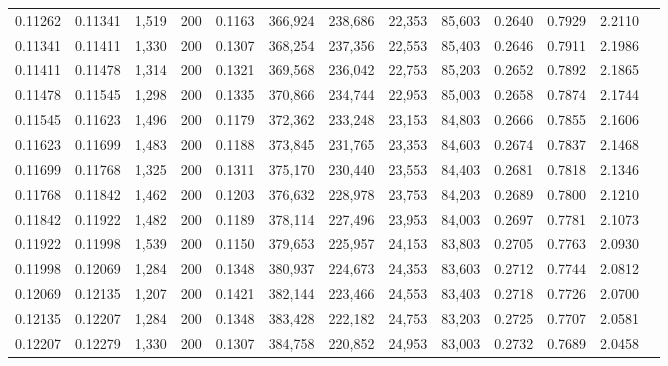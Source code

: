 \begin{tabular}{rrrrrrrrrrrrr}
0.11262 & 0.11341 &  1,519 & 200 &                                     0.1163 & 366,924 & 238,686 &  22,353 &  85,603 & 0.2640 & 0.7929 & 2.2110 \\
0.11341 & 0.11411 &  1,330 & 200 &                                     0.1307 & 368,254 & 237,356 &  22,553 &  85,403 & 0.2646 & 0.7911 & 2.1986 \\
0.11411 & 0.11478 &  1,314 & 200 &                                     0.1321 & 369,568 & 236,042 &  22,753 &  85,203 & 0.2652 & 0.7892 & 2.1865 \\
0.11478 & 0.11545 &  1,298 & 200 &                                     0.1335 & 370,866 & 234,744 &  22,953 &  85,003 & 0.2658 & 0.7874 & 2.1744 \\
0.11545 & 0.11623 &  1,496 & 200 &                                     0.1179 & 372,362 & 233,248 &  23,153 &  84,803 & 0.2666 & 0.7855 & 2.1606 \\
0.11623 & 0.11699 &  1,483 & 200 &                                     0.1188 & 373,845 & 231,765 &  23,353 &  84,603 & 0.2674 & 0.7837 & 2.1468 \\
0.11699 & 0.11768 &  1,325 & 200 &                                     0.1311 & 375,170 & 230,440 &  23,553 &  84,403 & 0.2681 & 0.7818 & 2.1346 \\
0.11768 & 0.11842 &  1,462 & 200 &                                     0.1203 & 376,632 & 228,978 &  23,753 &  84,203 & 0.2689 & 0.7800 & 2.1210 \\
0.11842 & 0.11922 &  1,482 & 200 &                                     0.1189 & 378,114 & 227,496 &  23,953 &  84,003 & 0.2697 & 0.7781 & 2.1073 \\
0.11922 & 0.11998 &  1,539 & 200 &                                     0.1150 & 379,653 & 225,957 &  24,153 &  83,803 & 0.2705 & 0.7763 & 2.0930 \\
0.11998 & 0.12069 &  1,284 & 200 &                                     0.1348 & 380,937 & 224,673 &  24,353 &  83,603 & 0.2712 & 0.7744 & 2.0812 \\
0.12069 & 0.12135 &  1,207 & 200 &                                     0.1421 & 382,144 & 223,466 &  24,553 &  83,403 & 0.2718 & 0.7726 & 2.0700 \\
0.12135 & 0.12207 &  1,284 & 200 &                                     0.1348 & 383,428 & 222,182 &  24,753 &  83,203 & 0.2725 & 0.7707 & 2.0581 \\
0.12207 & 0.12279 &  1,330 & 200 &                                     0.1307 & 384,758 & 220,852 &  24,953 &  83,003 & 0.2732 & 0.7689 & 2.0458 \\

\end{tabular}
